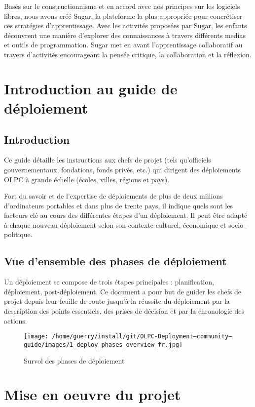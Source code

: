 \documentclass[12pt]{article}
\begin{document}


Basés sur le constructionnisme et en accord avec nos principes sur les
logiciels libres, nous avons créé Sugar, la plateforme la plus appropriée
pour concrétiser ces stratégies d'apprentissage. Avec les activités
proposées par Sugar, les enfants découvrent une manière d'explorer des
connaissances à travers différents medias et outils de programmation. Sugar
met en avant l'apprentissage collaboratif au travers d'activités
encourageant la pensée critique, la collaboration et la réflexion.
\section{Introduction au guide de déploiement}
\label{sec-3}
\subsection{Introduction}
\label{sec-3-1}


Ce guide détaille les instructions aux chefs de projet (tels qu'officiels
gouvernementaux, fondations, fonds privés, etc.) qui dirigent des
déploiements OLPC à grande échelle (écoles, villes, régions et pays).

Fort du savoir et de l'expertise de déploiements de plus de deux millions
d'ordinateurs portables et dans plus de trente pays, il indique quels sont
les facteurs clé au cours des différentes étapes d'un déploiement. Il peut
être adapté à chaque nouveau déploiement selon son contexte culturel,
économique et socio-politique.
\subsection{Vue d'ensemble des phases de déploiement}
\label{sec-3-2}


Un déploiement se compose de trois étapes principales : planification,
déploiement, post-déploiement. Ce document a pour but de guider les chefs
de projet depuis leur feuille de route jusqu'à la réussite du déploiement
par la description des points essentiels, des prises de décision et par la
chronologie des actions.

\begin{figure}[htb]
\centering
\texttt{[image: /home/guerry/install/git/OLPC-Deployment--community--guide/images/1\_deploy\_phases\_overview\_fr.jpg]}
\caption{Survol des phases de déploiement}
\end{figure}
\section{Mise en oeuvre du projet}
\label{sec-4}
\end{document}
